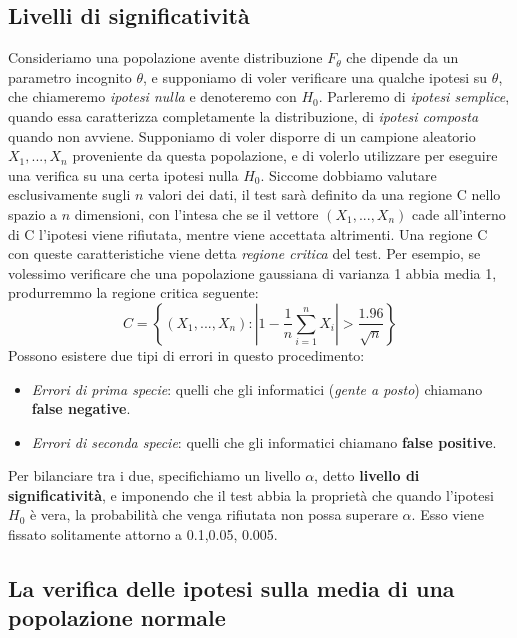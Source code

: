 \documentclass[11pt]{article}
\begin{document}
\subsection{Livelli di significatività}
Consideriamo una popolazione avente distribuzione $F_\theta$ che dipende da un parametro incognito $\theta$, e supponiamo di voler verificare una qualche ipotesi su $\theta$, che chiameremo \textit{ipotesi nulla} e denoteremo con $H_0$. Parleremo di \textit{ipotesi semplice}, quando essa caratterizza completamente la distribuzione, di \textit{ipotesi composta} quando non avviene. Supponiamo di voler disporre di un campione aleatorio $X_1,...,X_n$ proveniente da questa popolazione, e di volerlo utilizzare per eseguire una verifica su una certa ipotesi nulla $H_0$. Siccome dobbiamo valutare esclusivamente sugli $n$ valori dei dati, il test sarà definito da una regione C nello spazio a $n$ dimensioni, con l'intesa che se il vettore $(X_1,...,X_n)$ cade all'interno di C l'ipotesi viene rifiutata, mentre viene accettata altrimenti. Una regione C con queste caratteristiche viene detta \textit{regione critica} del test. Per esempio, se volessimo verificare che una popolazione gaussiana di varianza 1 abbia media 1, produrremmo la regione critica seguente:
\begin{displaymath}
    C=\left\{(X_1,...,X_n):\left|1-\frac{1}{n}\sum_{i=1}^n X_i\right| > \frac{1.96}{\sqrt{n}} \right\}
\end{displaymath}
Possono esistere due tipi di errori in questo procedimento:
\begin{itemize}
    \item \textit{Errori di prima specie}: quelli che gli informatici (\textit{gente a posto}) chiamano \textbf{false negative}.
    \item \textit{Errori di seconda specie}: quelli che gli informatici chiamano \textbf{false positive}.
\end{itemize}
Per bilanciare tra i due, specifichiamo un livello $\alpha$, detto \textbf{livello di significatività}, e imponendo che il test abbia la proprietà che quando l'ipotesi $H_0$ è vera, la probabilità che venga rifiutata non possa superare $\alpha$. Esso viene fissato solitamente attorno a 0.1,0.05, 0.005. 
\subsection{La verifica delle ipotesi sulla media di una popolazione normale}
\end{document}
